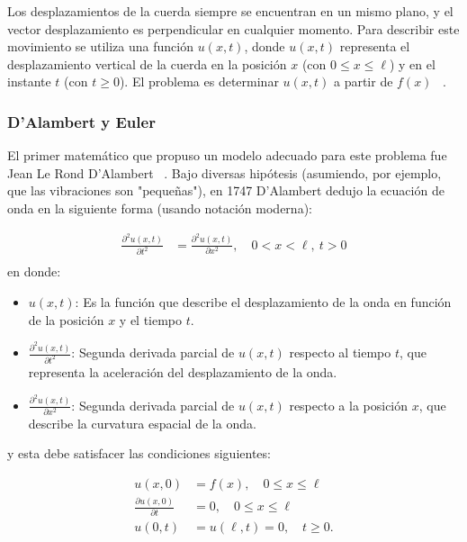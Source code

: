 Los desplazamientos de la cuerda siempre se encuentran en un mismo plano, y el vector desplazamiento es perpendicular en cualquier momento. Para describir este movimiento se utiliza una función $u(x, t)$, donde $u(x, t)$ representa el desplazamiento vertical de la cuerda en la posición $x$ (con $0 \leq x \leq \ell$) y en el instante $t$ (con $t \geq 0$). El problema es determinar $u(x, t)$ a partir de $f(x)$ ~\cite{historia-alambert-fourier-euler}.

\subsubsection{D’Alambert y Euler}
El primer matemático que propuso un modelo adecuado para este problema fue Jean Le Rond D’Alambert ~\cite{unal_52162}. Bajo diversas hipótesis (asumiendo, por ejemplo, que las vibraciones son "pequeñas"), en 1747 D’Alambert dedujo la ecuación de onda en la siguiente forma (usando notación moderna):

\begin{equation} \label{eq1}
	\begin{split}
		\frac{\partial^2 u(x,t)}{\partial t^2} &=  \frac{\partial^2 u(x,t)}{\partial x^2}, \quad 0 < x < \ell, \ t > 0 \\
	\end{split}
\end{equation}
en donde:
\begin{itemize}
	\item \( u(x,t) \): Es la función que describe el desplazamiento de la onda en función de la posición \( x \) y el tiempo \( t \).
	\item \( \frac{\partial^2 u(x,t)}{\partial t^2} \): Segunda derivada parcial de \( u(x,t) \) respecto al tiempo \( t \), que representa la aceleración del desplazamiento de la onda.
	\item \( \frac{\partial^2 u(x,t)}{\partial x^2} \): Segunda derivada parcial de \( u(x,t) \) respecto a la posición \( x \), que describe la curvatura espacial de la onda.
\end{itemize}

 y esta debe satisfacer las condiciones siguientes:

\begin{equation} \label{eq2}
	\begin{split}
		u(x,0) &= f(x), \quad 0 \leq x \leq \ell \\
		\frac{\partial u(x,0)}{\partial t} &= 0, \quad 0 \leq x \leq \ell \\
		u(0,t) &= u(\ell,t) = 0, \quad t \geq 0.
	\end{split}
\end{equation}


